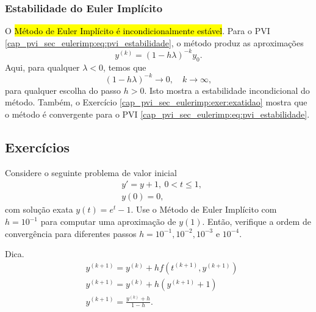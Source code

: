 \subsubsection{Estabilidade do Euler Implícito}

O \hl{Método de Euler Implícito é incondicionalmente estável}. Para o PVI \eqref{cap_pvi_sec_eulerimp:eq:pvi_estabilidade}, o método produz as aproximações
\begin{equation}
  y^{(k)} = \left(1 - h\lambda\right)^{-k}y_0.
\end{equation}
Aqui, para qualquer $\lambda<0$, temos que
\begin{equation}
  \left(1 - h\lambda\right)^{-k} \to 0,\quad k\to\infty,
\end{equation}
para qualquer escolha do passo $h>0$. Isto mostra a estabilidade incondicional do método. Também, o Exercício \ref{cap_pvi_sec_eulerimp:exer:exatidao} mostra que o método é convergente para o PVI \eqref{cap_pvi_sec_eulerimp:eq:pvi_estabilidade}.

\subsection{Exercícios}

\begin{exer}
  Considere o seguinte problema de valor inicial
  \begin{subequations}
    \begin{align}
      &y' = y + 1, ~0 < t \leq 1,\\
      &y(0) = 0,
    \end{align}
  \end{subequations}
  com solução exata $y(t) = e^{t} - 1$. Use o Método de Euler Implícito com $h = 10^{-1}$ para computar uma aproximação de $y(1)$. Então, verifique a ordem de convergência para diferentes passos $h = 10^{-1}, 10^{-2}, 10^{-3}$ e $10^{-4}$.
\end{exer}
\begin{resp}
  Dica.
  \begin{subequations}
    \begin{align}
      &y^{(k+1)} = y^{(k)} + hf\left(t^{(k+1)}, y^{(k+1)}\right)\\
      &y^{(k+1)} = y^{(k)} + h \left(y^{(k+1)} + 1\right)\\
      &y^{(k+1)} = \frac{y^{(k)} + h}{1 - h}.
    \end{align}
  \end{subequations}
\end{resp}

